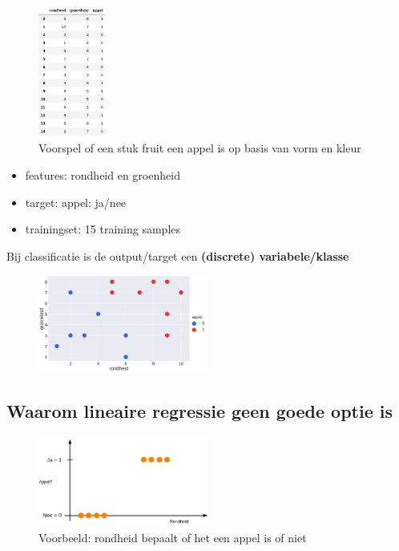 \documentclass{article}
\begin{document}
\begin{figure}[H]
    \centering
    \includegraphics[width=0.2\textwidth]{multilabel-classifier2.png}
    \caption{Voorspel of een stuk fruit een appel is op basis van vorm en kleur}
\end{figure}

\begin{itemize}
    \item features: rondheid en groenheid
    \item target: appel: ja/nee
    \item trainingset: 15 training samples
\end{itemize}

Bij classificatie is de output/target een \textbf{(discrete) variabele/klasse}

\begin{figure}[H]
    \centering
    \includegraphics[width=0.5\textwidth]{multilabel-classifier3.png}
    \caption{}
\end{figure}

\subsection{Waarom lineaire regressie geen goede optie is}

\begin{figure}[H]
    \centering
    \includegraphics[width=0.5\textwidth]{classificatie-regressie.png}
    \caption{Voorbeeld: rondheid bepaalt of het een appel is of niet}
\end{figure}
\end{document}
